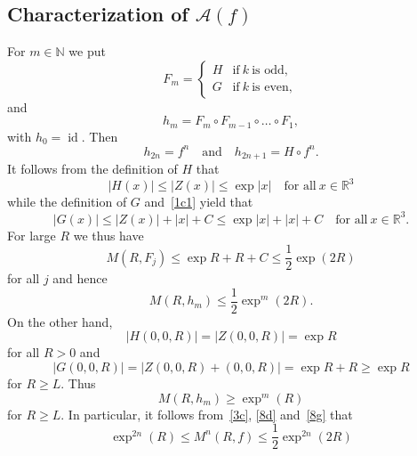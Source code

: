 \documentclass[12pt,a4paper]{amsart}
\theoremstyle{plain}
\theoremstyle{definition}
\theoremstyle{remark}
\def\R{\mathbb R}
\def\N{\mathbb N}
\def\id{\operatorname{id}}
\numberwithin{equation}{section}
\begin{document}
\subsection{Characterization of \texorpdfstring{$\mathcal{A}(f)$}{A(f)}} \label{char_A}
For $m\in\N$ we put 
\begin{equation}\label{3b}
F_m=
\begin{cases}
H & \text{if}\ k \ \text{is odd},\\
G & \text{if}\ k \ \text{is even},
\end{cases}
\end{equation}
and 
\begin{equation}\label{3b1}
h_m=F_m\circ F_{m-1}\circ\dots\circ F_1,
\end{equation}
with $h_0=\id$. Then
\begin{equation}\label{3c}
h_{2n}=f^n
\quad \text{and} \quad
h_{2n+1}=
H\circ f^n. 
\end{equation}
It follows from the definition of $H$ that
\begin{equation}\label{8a}
|H(x)|\leq |Z(x)|\leq \exp|x| 
\quad\text{for all}\ x\in\R^3
\end{equation}
while the definition of $G$ and~\eqref{1c1} yield that
\begin{equation}\label{8b}
|G(x)|\leq |Z(x)|+|x|+C\leq \exp|x|+|x|+C
\quad\text{for all}\ x\in\R^3 .
\end{equation}
For large $R$ we thus have 
\begin{equation}\label{8c}
M(R,F_j)\leq \exp R + R +C \leq \frac12 \exp(2R) 
\end{equation}
for all $j$ and hence 
\begin{equation}\label{8d}
M(R,h_m)\leq \frac12 \exp^m(2R) .
\end{equation}
On the other hand, 
\begin{equation}\label{8e}
|H(0,0,R)|= |Z(0,0,R)|=\exp R
\end{equation}
for all $R>0$ and 
\begin{equation}\label{8f}
|G(0,0,R)|= |Z(0,0,R)+(0,0,R)|=\exp R+R\geq \exp R
\end{equation}
for $R\geq  L$.
Thus 
\begin{equation}\label{8g}
M(R,h_m)\geq \exp^m(R) 
\end{equation}
for $R\geq  L$.
In particular, it follows from~\eqref{3c}, \eqref{8d} and~\eqref{8g} that
\begin{equation}\label{8h}
\exp^{2n}(R)\leq M^{n}(R,f)\leq \frac12 \exp^{2n}(2R) 
\end{equation}
\end{document}
